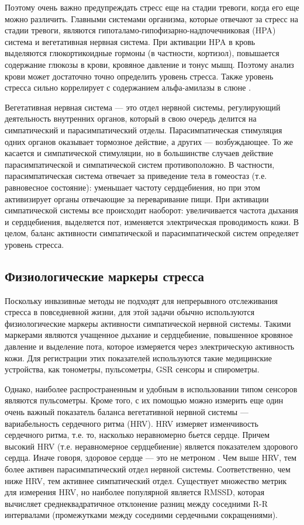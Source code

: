 \documentclass[14pt]{matmex-diploma-custom}
\begin{document}
Поэтому очень важно предупреждать стресс еще на стадии тревоги, когда его еще
можно различить. Главными системами организма, которые отвечают за стресс на
стадии тревоги, являются гипоталамо-гипофизарно-надпочечниковая (HPA) система и
вегетативная нервная система. При активации HPA в кровь выделяются
глюкортикоидные гормоны (в частности, кортизол), повышается содержание глюкозы в
крови, кровяное давление и тонус мышц. Поэтому анализ крови может достаточно
точно определить уровень стресса. Также уровень стресса сильно коррелирует с
содержанием альфа-амилазы в слюне \cite{article:alpha_amylase}.

Вегетативная нервная система --- это отдел нервной системы, регулирующий
деятельность внутренних органов, который в свою очередь делится на симпатический
и парасимпатический отделы. Парасимпатическая стимуляция одних органов оказывает
тормозное действие, а других --- возбуждающее. То же касается и симпатической
стимуляции, но в большинстве случаев действие парасимпатической и симпатической
систем противоположно. В частности, парасимпатическая система отвечает за
приведение тела в гомеостаз (т.е. равновесное состояние): уменьшает частоту
сердцебиения, но при этом активизирует органы отвечающие за переваривание пищи.
При активации симпатической системы все происходит наоборот: увеличивается
частота дыхания и сердцебиения, выделяется пот, изменяется электрическая
проводимость кожи. В целом, баланс активности симпатической и парасимпатической
систем определяет уровень стресса.

\subsection{Физиологические маркеры стресса}
Поскольку инвазивные методы не подходят для непрерывного отслеживания стресса в
повседневной жизни, для этой задачи обычно используются физиологические маркеры
активности симпатической нервной системы. Такими маркерами являются учащенное
дыхание и сердцебиение, повышенное кровяное давление и выделение пота, которое
измеряется через электрическую активность кожи. Для регистрации этих показателей
используются такие медицинские устройства, как тонометры, пульсометры, GSR
сенсоры и спирометры.

Однако, наиболее распространенным и удобным в использовании типом сенсоров
являются пульсометры. Кроме того, с их помощью можно измерить еще один очень
важный показатель баланса вегетативной нервной системы --- вариабельность
сердечного ритма (HRV). HRV измеряет изменчивость сердечного ритма, т.е. то,
насколько неравномерно бьется сердце. Причем высокий HRV (т.е. неравномерное
сердцебиение) является показателем здорового сердца. Иначе говоря, здоровое
сердце --- это не метроном \cite{article:not_metronome}. Чем выше HRV, тем более
активен парасимпатический отдел нервной системы. Соответственно, чем ниже HRV,
тем активнее симпатический отдел. Существует множество метрик для измерения HRV,
но наиболее популярной является RMSSD, которая вычисляет среднеквадратичное
отклонение разниц между соседними R-R интервалами (промежутками между соседними
сердечными сокращениями).
\end{document}
